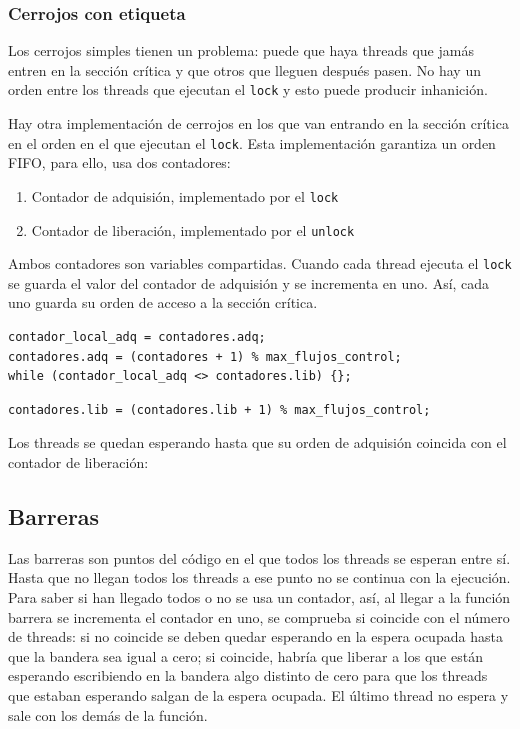 \documentclass[10pt,a4paper,spanish]{report}
\begin{document}
\textcolor[rgb]{0.2,0.4,0.8}{\subsubsection{Cerrojos con etiqueta}}
Los cerrojos simples tienen un problema: puede que haya threads que jamás entren en la sección crítica y que otros que lleguen después pasen. No hay un orden entre los threads que ejecutan el \verb*|lock| y esto puede producir inhanición.

Hay otra implementación de cerrojos en los que van entrando en la sección crítica en el orden en el que ejecutan el \verb*|lock|. Esta implementación garantiza un orden FIFO, para ello, usa dos contadores:
\begin{enumerate}[\color{azul}{\bf $\heartsuit$}]
    \item Contador de adquisión, implementado por el \verb*|lock|
    \item Contador de liberación, implementado por el \verb*|unlock|
\end{enumerate}

Ambos contadores son variables compartidas. Cuando cada thread ejecuta el \verb*|lock| se guarda el valor del contador de adquisión y se incrementa en uno. Así, cada uno guarda su orden de acceso a la sección crítica. 

\begin{center}

\begin{verbatim}
contador_local_adq = contadores.adq;
contadores.adq = (contadores + 1) % max_flujos_control;
while (contador_local_adq <> contadores.lib) {};
\end{verbatim}

\begin{verbatim}
contadores.lib = (contadores.lib + 1) % max_flujos_control;
\end{verbatim}
\end{center}

Los threads se quedan esperando hasta que su orden de adquisión coincida con el contador de liberación:

\begin{center}

\end{center}

\textcolor{azul}{\subsection{Barreras}}
Las barreras son puntos del código en el que todos los threads se esperan entre sí. Hasta que no llegan todos los threads a ese punto no se continua con la ejecución. Para saber si han llegado todos o no se usa un contador, así, al llegar a la función barrera se incrementa el contador en uno, se comprueba si coincide con el número de threads: si no coincide se deben quedar esperando en la espera ocupada hasta que la bandera sea igual a cero; si coincide, habría que liberar a los que están esperando escribiendo en la bandera algo distinto de cero para que los threads que estaban esperando salgan de la espera ocupada. El último thread no espera y sale con los demás de la función.
\end{document}

